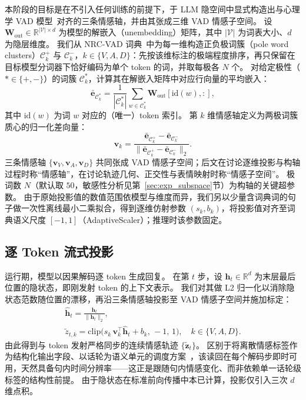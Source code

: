 \documentclass[letterpaper, 10 pt, conference]{ieeeconf/ieeeconf}
\begin{document}
本阶段的目标是在不引入任何训练的前提下，于 LLM 隐空间中显式构造出与心理学 VAD 模型~\cite{russell1977evidence}对齐的三条情感轴，并由其张成三维 VAD 情感子空间。
设 $\mathbf{W}_{\mathrm{out}} \in \mathbb{R}^{|\mathcal{V}| \times d}$ 为模型的解嵌入（unembedding）矩阵，其中 $|\mathcal{V}|$ 为词表大小、$d$ 为隐层维度。
我们从 NRC-VAD 词典~\cite{mohammad2018nrcvad}中为每一维构造正负极词簇（pole word clusters）$\mathcal{C}^{+}_k$ 与 $\mathcal{C}^{-}_k$，$k \in \{V, A, D\}$：先按该维标注的极端程度排序，再只保留在目标模型分词器下恰好编码为单个 token 的词，并取每极各 $N$ 个。
对给定极性（$* \in \{+, -\}$）的词簇 $\mathcal{C}^{*}_k$，计算其在解嵌入矩阵中对应行向量的平均嵌入：
\begin{equation}
    \bar{\mathbf{e}}_{\mathcal{C}^{*}_k} = \frac{1}{|\mathcal{C}^{*}_k|}\sum_{w \in \mathcal{C}^{*}_k} \mathbf{W}_{\mathrm{out}}[\mathrm{id}(w), :],
\end{equation}
其中 $\mathrm{id}(w)$ 为词 $w$ 对应的（唯一）token 索引。
第 $k$ 维情感轴定义为两极词簇质心的归一化差向量：
\begin{equation}
    \mathbf{v}_k = \frac{\bar{\mathbf{e}}_{\mathcal{C}^{+}_k} - \bar{\mathbf{e}}_{\mathcal{C}^{-}_k}}{\bigl\|\bar{\mathbf{e}}_{\mathcal{C}^{+}_k} - \bar{\mathbf{e}}_{\mathcal{C}^{-}_k}\bigr\|_2}.
    \label{eq:valence_axis}
\end{equation}
三条情感轴 $\{\mathbf{v}_V, \mathbf{v}_A, \mathbf{v}_D\}$ 共同张成 VAD 情感子空间；后文在讨论逐维投影与构轴过程时称``情感轴''，在讨论轨迹几何、正交性与表情映射时称``情感子空间''。
极词数 $N$（默认取 $50$，敏感性分析见第~\ref{sec:exp_subspace}节）为构轴的关键超参数。
由于原始投影值的数值范围依模型与维度而异，我们另以少量含词典词的句子做一次性离线最小二乘拟合，得到逐维仿射参数 $(s_k, b_k)$，将投影值对齐至词典语义尺度 $[-1, 1]$（AdaptiveScaler）；推理时该参数固定。

\subsection{逐 Token 流式投影}
\label{sec:projection}

运行期，模型以因果解码逐 token 生成回复。
在第 $t$ 步，设 $\mathbf{h}_t \in \mathbb{R}^{d}$ 为末层最后位置的隐状态，即刚发射 token 的上下文表示。
我们对其做 L2 归一化以消除隐状态范数随位置的漂移，再沿三条情感轴投影至 VAD 情感子空间并施加标定：
\begin{equation}
\begin{gathered}
    \hat{\mathbf{h}}_t = \frac{\mathbf{h}_t}{\|\mathbf{h}_t\|_2}, \\[2pt]
    \tilde{z}_{t,k} = \mathrm{clip}\bigl(s_k\,\mathbf{v}_k^\top\hat{\mathbf{h}}_t + b_k,\,-1,\,1\bigr),
    \quad k \in \{V, A, D\}.
\end{gathered}
\label{eq:projection}
\end{equation}
由此得到与 token 发射严格同步的连续情感轨迹 $\{\tilde{\mathbf{z}}_t\}$。
区别于将离散情感标签作为结构化输出字段、以话轮为语义单元的调度方案~\cite{mishra2023realtime}，该读回在每个解码步即时可用，天然具备句内时间分辨率——这正是跟随句内情感变化、而非依赖单一话轮级标签的结构性前提。
由于隐状态在标准前向传播中本已计算，投影仅引入三次 $d$ 维点积。
\end{document}
